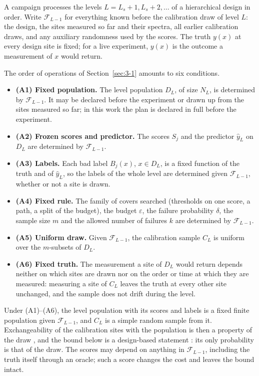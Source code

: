 \documentclass{iopjournal}
\providecommand{\tightlist}{\setlength{\itemsep}{0pt}\setlength{\parskip}{0pt}}
\begin{document}
A campaign processes the levels \(L = L_s + 1, L_s + 2, \dots\) of a hierarchical design in order. Write \(\mathcal{F}_{L-1}\) for everything known before the calibration draw of level \(L\): the design, the sites measured so far and their spectra, all earlier calibration draws, and any auxiliary randomness used by the scores. The truth \(y(x)\) at every design site is fixed; for a live experiment, \(y(x)\) is the outcome a measurement of \(x\) would return.

The order of operations of Section~\ref{sec:3-1} amounts to six conditions.

\begin{itemize}
\tightlist
\item
  \textbf{(A1) Fixed population.} The level population \(D_L\), of size \(N_L\), is determined by \(\mathcal{F}_{L-1}\). It may be declared before the experiment or drawn up from the sites measured so far; in this work the plan is declared in full before the experiment.
\item
  \textbf{(A2) Frozen scores and predictor.} The scores \(S_j\) and the predictor \(\hat y_L\) on \(D_L\) are determined by \(\mathcal{F}_{L-1}\).
\item
  \textbf{(A3) Labels.} Each bad label \(B_j(x)\), \(x \in D_L\), is a fixed function of the truth and of \(\hat y_L\), so the labels of the whole level are determined given \(\mathcal{F}_{L-1}\), whether or not a site is drawn.
\item
  \textbf{(A4) Fixed rule.} The family of covers searched (thresholds on one score, a path, a split of the budget), the budget \(\varepsilon\), the failure probability \(\delta\), the sample size \(m\) and the allowed number of failures \(k\) are determined by \(\mathcal{F}_{L-1}\).
\item
  \textbf{(A5) Uniform draw.} Given \(\mathcal{F}_{L-1}\), the calibration sample \(C_L\) is uniform over the \(m\)-subsets of \(D_L\).
\item
  \textbf{(A6) Fixed truth.} The measurement a site of \(D_L\) would return depends neither on which sites are drawn nor on the order or time at which they are measured: measuring a site of \(C_L\) leaves the truth at every other site unchanged, and the sample does not drift during the level.
\end{itemize}

Under (A1)--(A6), the level population with its scores and labels is a fixed finite population given \(\mathcal{F}_{L-1}\), and \(C_L\) is a simple random sample from it. Exchangeability of the calibration sites with the population is then a property of the draw \cite{Vovk2005}, and the bound below is a design-based statement \cite{Neyman1934,Cochran1977}: its only probability is that of the draw. The scores may depend on anything in \(\mathcal{F}_{L-1}\), including the truth itself through an oracle; such a score changes the cost and leaves the bound intact.
\end{document}
